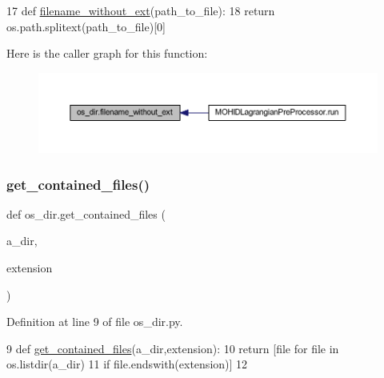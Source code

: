 \begin{DoxyCode}
17 \textcolor{keyword}{def }\mbox{\hyperlink{namespaceos__dir_a504bf6aacc096b5c5a86495a7485007e}{filename\_without\_ext}}(path\_to\_file): 
18     \textcolor{keywordflow}{return} os.path.splitext(path\_to\_file)[0]
\end{DoxyCode}
Here is the caller graph for this function\+:\nopagebreak
\begin{figure}[H]
\begin{center}
\leavevmode
\includegraphics[width=350pt]{namespaceos__dir_a504bf6aacc096b5c5a86495a7485007e_icgraph}
\end{center}
\end{figure}
\mbox{\label{namespaceos__dir_adfd8c337f0778c2c6fe21892478f5357}} 
\subsubsection{\texorpdfstring{get\+\_\+contained\+\_\+files()}{get\_contained\_files()}}
{\footnotesize\ttfamily def os\+\_\+dir.\+get\+\_\+contained\+\_\+files (\begin{DoxyParamCaption}\item[{}]{a\+\_\+dir,  }\item[{}]{extension }\end{DoxyParamCaption})}



Definition at line 9 of file os\+\_\+dir.\+py.


\begin{DoxyCode}
9 \textcolor{keyword}{def }\mbox{\hyperlink{namespaceos__dir_adfd8c337f0778c2c6fe21892478f5357}{get\_contained\_files}}(a\_dir,extension):
10     \textcolor{keywordflow}{return} [file \textcolor{keywordflow}{for} file \textcolor{keywordflow}{in} os.listdir(a\_dir)
11             \textcolor{keywordflow}{if} file.endswith(extension)]
12 
\end{DoxyCode}
\mbox{\label{namespaceos__dir_a7734a1131db0cd10af8ee0a4d9c5241d}} 
